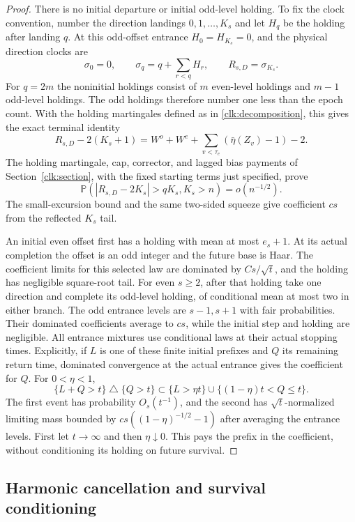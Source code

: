 \documentclass[11pt]{amsart}
\theoremstyle{definition}
\theoremstyle{remark}
\begin{document}
\begin{proof}
There is no initial departure or initial odd-level holding. To fix the
clock convention, number the direction landings $0,1,\ldots,K_s$ and
let $H_q$ be the holding after landing $q$. At this odd-offset entrance
$H_0=H_{K_s}=0$, and the physical direction clocks are
\[
 \sigma_0=0,\qquad \sigma_q=q+\sum_{r<q}H_r,\qquad
 R_{s,D}=\sigma_{K_s}.
\]
For $q=2m$ the noninitial holdings consist of $m$ even-level holdings
and $m-1$ odd-level holdings. The odd holdings therefore number one
less than the epoch count. With the holding martingales defined as in
\eqref{clk:decomposition}, this gives the exact terminal identity
\[
 R_{s,D}-2(K_s+1)
 =W^o+W^e+\sum_{v<\tau_e}(\bar\eta(Z_v)-1)-2.
\]
The holding martingale, cap, corrector, and lagged bias payments of
Section~\ref{clk:section}, with the fixed starting terms just specified,
prove
\[
 \mathbb P(|R_{s,D}-2K_s|>qK_s,K_s>n)=o(n^{-1/2}).
\]
The small-excursion bound and the same two-sided squeeze give coefficient
$cs$ from the reflected $K_s$ tail.

An initial even offset first has a holding with mean at most $e_s+1$.
At its actual completion the offset is an odd integer and the future
base is Haar. The coefficient limits for this selected law are dominated
by $Cs/\sqrt t$, and the holding has negligible square-root tail.
For even $s\ge2$, after that holding take one direction and complete its
odd-level holding, of conditional mean at most two in either branch.
The odd entrance levels are
$s-1,s+1$ with fair probabilities. Their dominated coefficients average
to $cs$, while the initial step and holding are negligible. All entrance
mixtures use conditional laws at their actual stopping times. Explicitly,
if $L$ is one of these finite initial prefixes and $Q$ its remaining
return time, dominated convergence at the actual entrance gives the
coefficient for $Q$. For $0<\eta<1$,
\[
 \{L+Q>t\}\mathbin{\triangle}\{Q>t\}
 \subset\{L>\eta t\}\cup\{(1-\eta)t<Q\le t\}.
\]
The first event has probability $O_s(t^{-1})$, and the second has
$\sqrt t$-normalized limiting mass bounded by
$cs((1-\eta)^{-1/2}-1)$ after averaging the entrance levels.
First let $t\to\infty$ and then $\eta\downarrow0$. This pays the
prefix in the coefficient, without conditioning its holding on future
survival.
\end{proof}

\subsection{Harmonic cancellation and survival conditioning}
\end{document}
